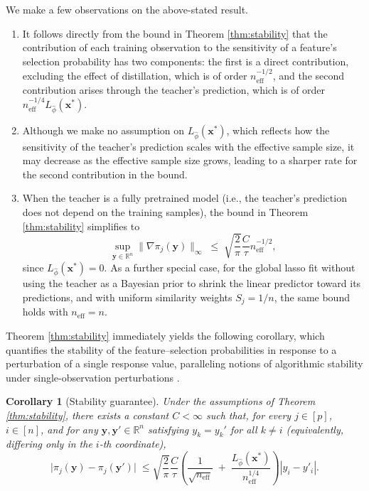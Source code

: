 \documentclass[12pt]{article}
\newcommand{\R}{\mathbb{R}}
\newcommand{\neff}{n_{\mathrm{eff}}}
\newtheorem{corollary}{Corollary}
\theoremstyle{definition}
\begin{document}
We make a few observations on the above-stated result.
\begin{enumerate}[leftmargin=*]
\item[(i)] It follows directly from the bound in Theorem \ref{thm:stability} that the contribution of each training observation to the sensitivity of a feature's selection probability has two components: the first is a direct contribution, excluding the effect of distillation, which is of order $\neff^{-1/2}$, and the second contribution arises through the teacher's prediction, which is of order $\neff^{-1/4} L_{\hat\phi}(\bm{x}^*)$.
\item[(ii)] Although we make no assumption on $L_{\hat\phi}(\bm{x}^*)$, which reflects how the sensitivity of the teacher's prediction scales with the effective sample size, it may decrease as the effective sample size grows, leading to a sharper rate for the second contribution in the bound.
\item[(iii)] When the teacher is a fully pretrained model (i.e., the teacher's prediction does not depend on the training samples), the bound in Theorem \ref{thm:stability} simplifies to 
$$\sup_{\bm{y}\in \R^n} \|\nabla \pi_j(\bm{y})\|_{\infty}\;\le\;\sqrt{\frac{2}{\pi}}\frac{C}{\tau} \neff^{-1/2},$$
since $L_{\hat\phi}(\bm{x}^*)=0$. 
As a further special case, for the global lasso fit without using the teacher as a Bayesian prior to shrink the linear predictor toward its predictions, and with uniform similarity weights $S_j= 1/n$, the same bound holds with $\neff=n$.
\end{enumerate}

Theorem \ref{thm:stability} immediately yields the following corollary, which quantifies the stability of the feature--selection probabilities in response to a perturbation of a single response value, paralleling notions of algorithmic stability under single-observation perturbations \citep{bousquet2002stability}.



\begin{corollary}[Stability guarantee]
Under the assumptions of Theorem \ref{thm:stability}, there exists a constant $C<\infty$ such that, for every $j\in[p]$, $i\in[n]$, and for any $\bm{y},\bm{y}'\in\mathbb{R}^n$ satisfying $y_k=y_k'$ for all $k\neq i$ (equivalently, differing only in the $i$-th coordinate),
$$\bigl\lvert \pi_j(\bm{y}) - \pi_j(\bm{y}') \bigr\rvert\;\le \sqrt{\frac{2}{\pi}}\frac{C}{\tau}
  \left(\frac{1}{\sqrt{\neff}}
    \;+\; \frac{L_{\hat\phi}(\bm{x}^*)}{\neff^{1/4}}\right) |y_i - y'_i|.$$ 
\label{cor:stability}
\end{corollary}
\end{document}
